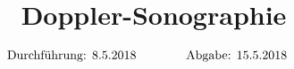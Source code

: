 

\subject{US3}
\title{Doppler-Sonographie}

\date{
  \begin{align}
    \text{Durchführung: } & \text{8.5.2018} & \hspace{3em} & \text{Abgabe: 15.5.2018} \notag
  \end{align}
}




\maketitle
\thispagestyle{empty}
\tableofcontents
\newpage






\nocite{*}
\printbibliography{}


